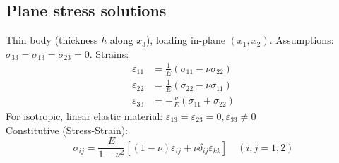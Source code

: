 \documentclass[10pt,twocolumn, a4paper]{article}
\begin{document}
\subsection{Plane stress solutions}
Thin body (thickness $h$ along $x_3$), loading in-plane $(x_1, x_2)$.
Assumptions: $\sigma_{33} = \sigma_{13} = \sigma_{23} = 0$.
Strains:
\begin{align*}
    \varepsilon_{11} &= \frac{1}{E}(\sigma_{11} - \nu \sigma_{22}) \\
    \varepsilon_{22} &= \frac{1}{E}(\sigma_{22} - \nu \sigma_{11}) \\
    \varepsilon_{33} &= -\frac{\nu}{E}(\sigma_{11} + \sigma_{22})
\end{align*}
For isotropic, linear elastic material: $\varepsilon_{13}=\varepsilon_{23}=0, \varepsilon_{33}\neq 0$\\
Constitutive (Stress-Strain):
\[ \sigma_{ij} = \frac{E}{1-\nu^2} [(1-\nu)\varepsilon_{ij} + \nu \delta_{ij} \varepsilon_{kk}] \quad (i,j = 1,2) \]
\end{document}
